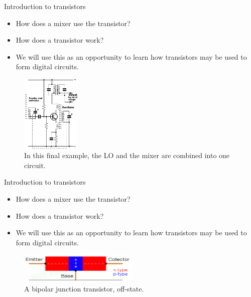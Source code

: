 \documentclass{beamer}
\begin{document}
\begin{frame}{Introduction to transistors}
\begin{itemize}
\item \alert{How does a mixer use the transistor?}
\item How does a transistor work?
\item We will use this as an opportunity to learn how transistors may be used to form digital circuits.
\end{itemize}
\begin{figure}
\centering
\includegraphics[width=0.25\textwidth]{figures/BJT3.png}
\caption{\label{fig:bjt3} In this final example, the LO and the mixer are combined into one circuit.}
\end{figure}
\end{frame}

\begin{frame}{Introduction to transistors}
\begin{itemize}
\item How does a mixer use the transistor?
\item \alert{How does a transistor work?}
\item We will use this as an opportunity to learn how transistors may be used to form digital circuits.
\end{itemize}
\begin{figure}
\centering
\includegraphics[width=0.5\textwidth]{figures/transistor2.png}
\caption{\label{fig:transistor2} A bipolar junction transistor, off-state.}
\end{figure}
\end{frame}
\end{document}
